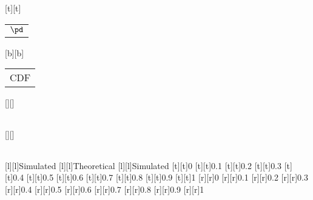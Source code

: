 %    
%
%
%
[t][t]{\fontsize{9}{13.5}\selectfont \color[rgb]{0,0,0}\setlength{\tabcolsep}{0pt}\begin{tabular}{c}$\pd$\end{tabular}}%
[b][b]{\fontsize{9}{13.5}\selectfont \color[rgb]{0,0,0}\setlength{\tabcolsep}{0pt}\begin{tabular}{c}CDF\end{tabular}}%
[][]{\fontsize{10}{15}\selectfont \color[rgb]{0,0,0}\setlength{\tabcolsep}{0pt}\begin{tabular}{c} \end{tabular}}%
[][]{\fontsize{10}{15}\selectfont \color[rgb]{0,0,0}\setlength{\tabcolsep}{0pt}\begin{tabular}{c} \end{tabular}}%
[l][l]{\fontsize{9}{13.5}\selectfont \color[rgb]{0,0,0}Simulated}%
[l][l]{\fontsize{9}{13.5}\selectfont \color[rgb]{0,0,0}Theoretical}%
[l][l]{\fontsize{9}{13.5}\selectfont \color[rgb]{0,0,0}Simulated}%
%
\fontsize{9}{13.5}%
\selectfont%
%
[t][t]{0}%
[t][t]{0.1}%
[t][t]{0.2}%
[t][t]{0.3}%
[t][t]{0.4}%
[t][t]{0.5}%
[t][t]{0.6}%
[t][t]{0.7}%
[t][t]{0.8}%
[t][t]{0.9}%
[t][t]{1}%
%
[r][r]{0}%
[r][r]{0.1}%
[r][r]{0.2}%
[r][r]{0.3}%
[r][r]{0.4}%
[r][r]{0.5}%
[r][r]{0.6}%
[r][r]{0.7}%
[r][r]{0.8}%
[r][r]{0.9}%
[r][r]{1}%
%
%
